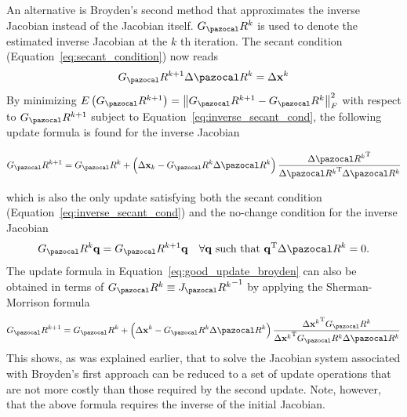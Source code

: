 An alternative is Broyden's second method that approximates the inverse Jacobian instead of the Jacobian itself.
\(G_\pazocal R^{k}\) is used to denote the estimated inverse Jacobian at the \(k\) th iteration.
The secant condition (Equation~\eqref{eq:secant_condition}) now reads
\begin{equation} \label{eq:inverse_secant_cond}
G_\pazocal R^{k+1} \Delta \pazocal R^{k}=\Delta \mathbf x^{k}
\end{equation}
By minimizing \(E\left(G_\pazocal R^{k+1}\right)=\left\|G_\pazocal R^{k+1}-G_\pazocal R^{k}\right\|_{F}^{2}\) with respect to \(G_\pazocal R^{k+1}\) subject to Equation~\eqref{eq:inverse_secant_cond}, the following update formula is found for the inverse Jacobian
\begin{highlight}
  \begin{equation} \label{eq:bad_update_broyden}
  G_\pazocal R^{k+1}=G_\pazocal R^{k}+\left(\Delta \mathbf x_{k}-G_\pazocal R^{k} \Delta \pazocal R^{k}\right) \frac{\Delta {\pazocal R^{k}}^{\mathrm{T}}}{\Delta {\pazocal R^{k}}^{\mathrm{T}} \Delta \pazocal R^{k}}
  \end{equation}
\end{highlight}
which is also the only update satisfying both the secant condition (Equation~\eqref{eq:inverse_secant_cond}) and the no-change condition for the inverse Jacobian
\begin{equation}
  G_\pazocal R^{k} \mathbf q=G_\pazocal R^{k+1} \mathbf q \quad \forall \mathbf q \text { such that } \mathbf q^{\mathrm{T}} \Delta \pazocal R^{k}=0.
\end{equation}
The update formula in Equation~\eqref{eq:good_update_broyden} can also be obtained in terms of \(G_\pazocal R^{k} \equiv {J_\pazocal R^{k}}^{-1}\) by applying the Sherman-Morrison formula
\begin{equation} \label{eq:g_broyden_type_i}
G_\pazocal R^{k+1}=G_\pazocal R^{k}+\left(\Delta \mathbf x^{k}-G_\pazocal R^{k} \Delta \pazocal R^{k}\right) \frac{\Delta {\mathbf x^{k}}^{\mathrm{T}} G_\pazocal R^{k}}{\Delta {\mathbf x^{k}}^{\mathrm{T}} G_\pazocal R^{k} \Delta \pazocal R^{k}}
\end{equation}
This shows, as was explained earlier, that to solve the Jacobian system associated with Broyden's first approach can be reduced to a set of update operations that are not more costly than those required by the second update.
Note, however, that the above formula requires the inverse of the initial Jacobian.

